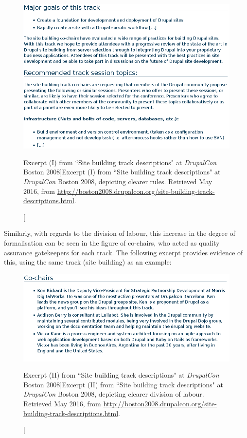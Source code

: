 \begin{figure}[H]
  \centering
\includegraphics[width=\textwidth]{img/quotes_replacement/dcon_boston_01.png}
\caption[Excerpt (I) from ``Site building track descriptions" at \textit{DrupalCon} Boston 2008]{Excerpt (I) from ``Site building track descriptions" at \textit{DrupalCon} Boston 2008,  depicting clearer rules. Retrieved  May 2016, from \url{http://boston2008.drupalcon.org/site-building-track-descriptions.html}.}
\label{dcon_boston01}
\end{figure}

Similarly, with regards to the division of labour, this increase in the degree of formalisation can be seen in the figure of co-chairs, who acted as quality assurance gatekeepers for each track. The following excerpt provides evidence of this, using the same track (site building) as an example:

\begin{figure}[H]
  \centering
\includegraphics[width=\textwidth]{img/quotes_replacement/dcon_boston_02.png}
\caption[Excerpt (II) from ``Site building track descriptions" at \textit{DrupalCon} Boston 2008]{Excerpt (II) from ``Site building track descriptions" at \textit{DrupalCon} Boston 2008,  depicting clearer division of labour. Retrieved  May 2016, from \url{http://boston2008.drupalcon.org/site-building-track-descriptions.html}.}
\label{dcon_boston02}
\end{figure}


